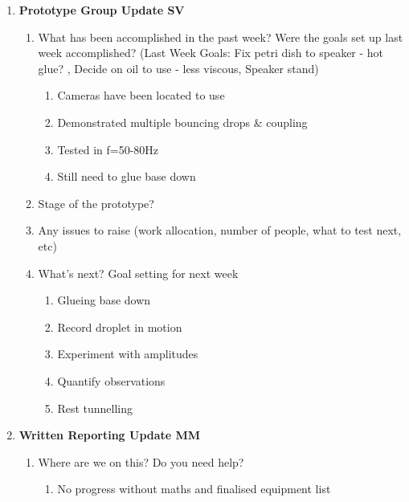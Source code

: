 \begin{enumerate}
\item  \textbf{Prototype Group Update SV}

\begin{enumerate}
\item What has been accomplished in the past week? Were the goals set up last week accomplished? (Last Week Goals: Fix petri dish to speaker - hot glue? , Decide on oil to use - less viscous, Speaker stand)

\begin{enumerate}
\item  Cameras have been located to use

\item  Demonstrated multiple bouncing drops \& coupling

\item  Tested in f=50-80Hz

\item  Still need to glue base down
\end{enumerate}

\item  Stage of the prototype?

\item  Any issues to raise (work allocation, number of people, what to test next, etc)

\item  What's next? Goal setting for next week

\begin{enumerate}
\item  Glueing base down

\item  Record droplet in motion

\item  Experiment with amplitudes

\item  Quantify observations

\item  Rest tunnelling\\
\end{enumerate}
\end{enumerate}

\item  \textbf{Written Reporting Update MM}

\begin{enumerate}
\item Where are we on this? Do you need help?

\begin{enumerate}
\item  No progress without maths and finalised equipment list
\end{enumerate}


\end{enumerate}
\end{enumerate}
